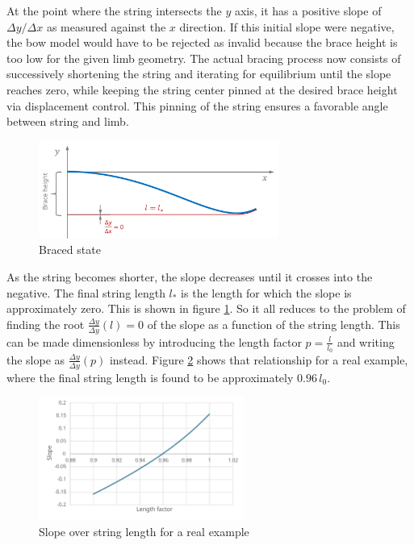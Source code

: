 At the point where the string intersects the $y$ axis, it has a positive slope of $\Delta y / \Delta x$ as measured against the $x$ direction.
If this initial slope were negative, the bow model would have to be rejected as invalid because the brace height is too low for the given limb geometry.
The actual bracing process now consists of successively shortening the string and iterating for equilibrium until the slope reaches zero, while keeping the string center pinned at the desired brace height via displacement control.
This pinning of the string ensures a favorable angle between string and limb.

\begin{figure}[h]
\centering
\includegraphics[width=0.7\textwidth]{figures/solution/bracing-method-2}
\caption{Braced state}
\label{fig:bracing-method-2}
\end{figure}

As the string becomes shorter, the slope decreases until it crosses into the negative.
The final string length $l_*$ is the length for which the slope is approximately zero.
This is shown in figure \ref{fig:bracing-method-2}.
So it all reduces to the problem of finding the root $\frac{\Delta y}{\Delta y}(l) = 0$ of the slope as a function of the string length.
This can be made dimensionless by introducing the length factor $p = \frac{l}{l_{0}}$ and writing the slope as $\frac{\Delta y}{\Delta y}(p)$ instead.
Figure \ref{fig:bracing-plot} shows that relationship for a real example, where the final string length is found to be approximately $0.96\,l_{0}$.

\begin{figure}[h]
\centering
\includegraphics[width=0.6\textwidth]{figures/solution/bracing-plot}
\caption{Slope over string length for a real example}
\label{fig:bracing-plot}
\end{figure}

